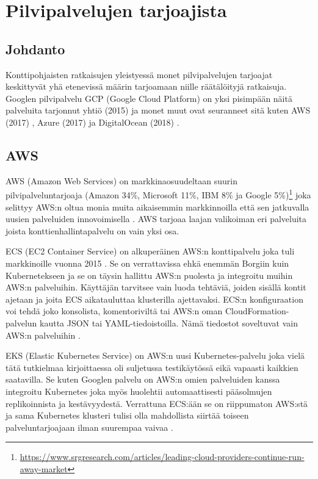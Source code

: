 \documentclass[finnish,gradu]{tktltiki3}
\begin{document}
\section{Pilvipalvelujen tarjoajista}

\subsection{Johdanto}

Konttipohjaisten ratkaisujen yleistyessä monet pilvipalvelujen tarjoajat keskittyvät yhä etenevissä määrin tarjoamaan niille räätälöityjä ratkaisuja. Googlen pilvipalvelu GCP (Google Cloud Platform) on yksi pisimpään näitä palveluita tarjonnut yhtiö (2015) \cite{gcp-kubernetes} ja monet muut ovat seuranneet sitä kuten AWS (2017) \cite{aws-kubernetes}, Azure (2017) \cite{azure-kubernetes} ja DigitalOcean (2018) \cite{digital-ocean-kubernetes}.

\subsection{AWS}
\label{ch:aws}

AWS (Amazon Web Services) on markkinaosuudeltaan suurin pilvipalveluntarjoaja (Amazon 34\%, Microsoft 11\%, IBM 8\% ja Google 5\%)\footnote{\url{https://www.srgresearch.com/articles/leading-cloud-providers-continue-run-away-market}} joka selittyy AWS:n oltua monia muita aikaisemmin markkinnoilla että sen jatkuvalla uusien palveluiden innovoimisella \cite{aws-leading-cloud}. AWS tarjoaa laajan valikoiman eri palveluita joista konttienhallintapalvelu on vain yksi osa.

ECS (EC2 Container Service) on alkuperäinen AWS:n konttipalvelu joka tuli markkinoille vuonna 2015 \cite{aws-introducing-ecs}. Se on verrattavissa ehkä enemmän Borgiin kuin Kubernetekseen ja se on täysin hallittu AWS:n puolesta ja integroitu muihin AWS:n palveluihin. Käyttäjän tarvitsee vain luoda tehtäviä, joiden sisällä kontit ajetaan ja joita ECS aikatauluttaa klusterilla ajettavaksi. ECS:n konfiguraation voi tehdä joko konsolista, komentoriviltä tai AWS:n oman CloudFormation-palvelun kautta JSON tai YAML-tiedoistoilla. Nämä tiedostot soveltuvat vain AWS:n palveluihin \cite{aws-docs-ecs}.

EKS (Elastic Kubernetes Service) on AWS:n uusi Kubernetes-palvelu joka vielä tätä tutkielmaa kirjoittaessa oli suljetussa testikäytössä eikä vapaasti kaikkien saatavilla. Se kuten Googlen palvelu on AWS:n omien palveluiden kanssa integroitu Kubernetes joka myös huolehtii automaattisesti pääsolmujen replikoinnista ja kestävyydestä. Verrattuna ECS:ään se on riippumaton AWS:stä ja sama Kubernetes klusteri tulisi olla mahdollista siirtää toiseen palveluntarjoajaan ilman suurempaa vaivaa \cite{aws-docs-eks}.
\end{document}

